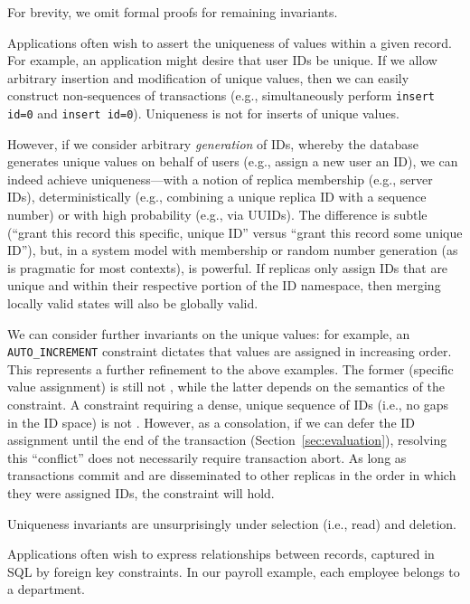 For brevity, we omit formal proofs for remaining invariants.

 Applications often wish to assert the uniqueness
of values within a given record. For example, an application might
desire that user IDs be unique. If we allow arbitrary insertion and
modification of unique values, then we can easily construct
non-\iconfluent sequences of transactions (e.g., simultaneously
perform \texttt{insert id=0} and \texttt{insert id=0}). Uniqueness is
not \iconfluent for inserts of unique values.

However, if we consider arbitrary \textit{generation} of IDs, whereby
the database generates unique values on behalf of users (e.g., assign
a new user an ID), we can indeed achieve uniqueness---with a notion of
replica membership (e.g., server IDs), deterministically (e.g.,
combining a unique replica ID with a sequence number) or with high
probability (e.g., via UUIDs). The difference is subtle (``grant this
record this specific, unique ID'' versus ``grant this record some
unique ID''), but, in a system model with membership or random number
generation (as is pragmatic for most contexts), is powerful. If
replicas only assign IDs that are unique and within their respective
portion of the ID namespace, then merging locally valid states will
also be globally valid.

We can consider further invariants on the unique values: for example,
an \texttt{AUTO\_INCREMENT} constraint dictates that values are
assigned in increasing order. This represents a further refinement to
the above examples. The former (specific value assignment) is still
not \iconfluent, while the latter depends on the semantics of the
constraint. A constraint requiring a dense, unique sequence of IDs
(i.e., no gaps in the ID space) is not \iconfluent. However, as a
consolation, if we can defer the ID assignment until the end of the
transaction (Section~\ref{sec:evaluation}), resolving this
``conflict'' does not necessarily require transaction abort. As long
as transactions commit and are disseminated to other replicas in the
order in which they were assigned IDs, the constraint will hold.

Uniqueness invariants are unsurprisingly \iconfluent under selection
(i.e., read) and deletion.

 Applications often wish to express
relationships between records, captured in SQL by foreign key
constraints. In our payroll example, each employee belongs to a
department.

